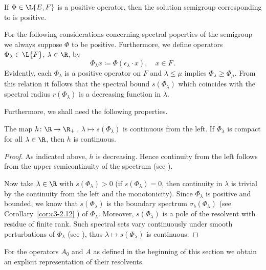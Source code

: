\begin{proposition}\label{prop:c4-3.3}
If\/ $\Phi \in \L{E,F}$ is a positive operator, then the solution semigroup corresponding to  is positive.
\end{proposition}
For the following considerations concerning spectral poperties of the semigroup we always suppose $\Phi$ to be positive. Furthermore, we define operators $\Phi_{\lambda} \in \L{F}$, $\lambda \in \R$, by
\begin{equation}\label{eq:c4-3.6}
\Phi_\lambda x \coloneqq \Phi(\epsilon_{\lambda} \cdot x), \quad x \in F\,.
\end{equation}
Evidently, each $\Phi_\lambda$ is a positive operator on $F$ and $\lambda \leq \mu$ implies $\Phi_{\lambda} \geq \Phi_{\mu}$.
From this relation it follows that the spectral bound $s(\Phi_{\lambda})$ which coincides with the spectral radius $r(\Phi_{\lambda})$ is a decreasing function in $\lambda$.

Furthermore, we shall need the following properties.

\begin{lemma}\label{lem:c4-3.4}
%
The map $h \colon \R \to \R_{+}$\,, $\lambda \mapsto s(\Phi_{\lambda})$ is continuous from the left. 
If\/ $\Phi_{\lambda}$ is compact for all $\lambda \in \R$, then $h$ is continuous.
\end{lemma}
\begin{proof}
As indicated above, $h$ is decreasing. Hence continuity from the left follows from the upper semicontinuity of the spectrum (see \textcite[Chapter IV, Theorem~3.1]{kato:1976}).

Now take $\lambda \in \R$ with $s(\Phi_{\lambda}) > 0$ (if\/ $s( \Phi_{\lambda}) = 0$, then continuity in $\lambda$ is trivial by the continuity from the left and the monotonicity). Since $\Phi_{\lambda}$ is positive and bounded, we know that 
$s(\Phi_{\lambda})$ is the boundary spectrum $\sigma_b(\Phi_{\lambda})$ (see Corollary~\ref{cor:c3-2.12} ) of\/ $\Phi_{\lambda}$. Moreover, $s(\Phi_{\lambda})$ is a pole of the resolvent with residue of finite rank. Such spectral sets vary continuously under smooth perturbations of\/ $\Phi_{\lambda}$ (see \textcite[VII.6, Theorem 9]{dunfordschwartz:1958}), thus $\lambda \mapsto s(\Phi_{\lambda})$ is continuous.
\end{proof}
For the operators $A_{0}$ and $A$ as defined in the beginning of this section we obtain an explicit representation of their resolvents.

